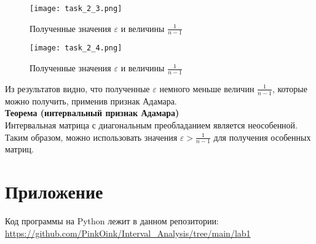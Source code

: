 \newpage

\begin{figure}[h]
	\centering
	\texttt{[image: task\_2\_3.png]}
	\caption{Полученные значения $\varepsilon$ и величины $\frac{1}{n - 1}$}
\end{figure}

\newpage

\begin{figure}[h]
	\centering
	\texttt{[image: task\_2\_4.png]}
	\caption{Полученные значения $\varepsilon$ и величины $\frac{1}{n - 1}$}
\end{figure}

Из результатов видно, что полученные $\varepsilon$ немного меньше величин $\frac{1}{n - 1}$, которые можно получить, применив признак Адамара. \\

\textbf{Теорема (интервальный признак Адамара)} \\
Интервальная матрица с диагональным преобладанием является неособенной. \\

Таким образом, можно использовать значения $\varepsilon > \frac{1}{n - 1}$ для получения особенных матриц.


\section{Приложение}
Код программы на Python лежит в данном репозитории: \\
\url{https://github.com/PinkOink/Interval_Analysis/tree/main/lab1}{}


